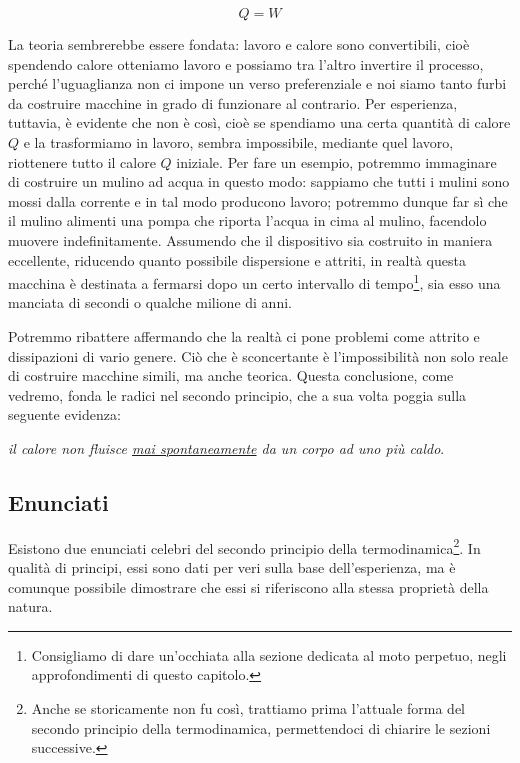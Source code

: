 \[ Q = W \]

\noindent La teoria sembrerebbe essere fondata: lavoro e calore sono
convertibili, cioè spendendo calore otteniamo lavoro e possiamo tra l'altro
invertire il processo, perché l'uguaglianza non ci impone un
verso preferenziale e noi siamo tanto furbi da costruire macchine
in grado di funzionare al contrario. Per esperienza, tuttavia, è evidente che non
è così, cioè se spendiamo una certa quantità di calore $Q$ e
la trasformiamo in lavoro, sembra impossibile, mediante quel lavoro,
riottenere tutto il calore $Q$ iniziale. Per fare un esempio, potremmo
immaginare di costruire un mulino ad acqua in questo modo: sappiamo che
tutti i mulini sono mossi dalla corrente e in tal modo producono
lavoro; potremmo dunque far sì che il mulino alimenti una pompa che
riporta l'acqua in cima al mulino, facendolo muovere indefinitamente.
Assumendo che il dispositivo sia costruito in maniera
eccellente, riducendo quanto possibile dispersione e attriti,
in realtà questa macchina è destinata a fermarsi dopo un certo
intervallo di tempo\footnote{Consigliamo di dare un'occhiata alla
sezione dedicata al moto perpetuo, negli approfondimenti di questo
capitolo.}, sia esso una manciata di secondi o qualche milione di
anni.

Potremmo ribattere affermando che la realtà ci pone problemi come
attrito e dissipazioni di vario genere. Ciò che è sconcertante è
l'impossibilità non solo reale di costruire macchine simili,
ma anche teorica. Questa conclusione, come vedremo, fonda
le radici nel secondo principio, che a sua volta poggia sulla
seguente evidenza:

\begin{center}
    \textit{il calore non fluisce \underline{\emph{mai spontaneamente}} da un corpo ad uno più caldo}.
\end{center}

\subsection{Enunciati}
Esistono due enunciati celebri del secondo principio della termodinamica\footnote{Anche se storicamente non fu così, trattiamo prima l'attuale forma
del secondo principio della termodinamica, permettendoci di chiarire
le sezioni successive.}.
In qualità di principi, essi sono dati per veri sulla base dell'esperienza,
ma è comunque possibile dimostrare che essi si riferiscono alla
stessa proprietà della natura.

